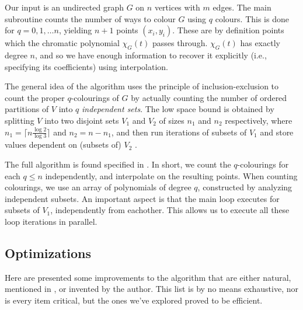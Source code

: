 \documentclass[a4paper]{article}
\begin{document}
Our input is an undirected graph $G$ on $n$ vertices with $m$ edges\footnotemark. The main subroutine counts the number of ways to colour $G$ using $q$ colours. This is done for $q = 0, 1, \ldots n$, yielding $n + 1$ points $(x_i, y_i)$. These are by definition points which the chromatic polynomial $\chi_G(t)$ passes through. $\chi_G(t)$ has exactly degree $n$, and so we have enough information to recover it explicitly (i.e., specifying its coefficients) using interpolation.

The general idea of the algorithm uses the principle of inclusion-exclusion to count the proper $q$-colourings of $G$ by actually counting the number of ordered partitions of $V$ into $q$ \emph{independent sets}. The low space bound is obtained by splitting $V$ into two disjoint sets $V_1$ and $V_2$ of sizes $n_1$ and $n_2$ respectively, where $n_1 = \lceil n \frac{\log2}{\log3} \rceil$ and $n_2 = n - n_1$, and then run iterations of subsets of $V_1$ and store values dependent on (subsets of) $V_2$ \cite[sec. 5]{cov_pack}. 


The full algorithm is found specified in \cite[p. 9]{cov_pack}. In short, we count the $q$-colourings for each $q \leq n$ independently, and interpolate on the resulting points. When counting colourings, we use an array of polynomials of degree $q$, constructed by analyzing independent subsets. An important aspect is that the main loop executes for subsets of $V_1$, independently from eachother. This allows us to execute all these loop iterations in parallel.

\subsection{Optimizations}\label{opts}
Here are presented some improvements to the algorithm that are either natural, mentioned in \cite{cov_pack}, or invented by the author. This list is by no means exhaustive, nor is every item critical, but the ones we've explored proved to be efficient.
\end{document}
